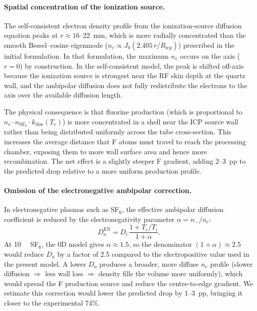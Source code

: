 \documentclass[11pt,a4paper]{report}
\newcommand{\SFsix}{\mathrm{SF}_6}
\newcommand{\Te}{T_e}
\begin{document}
\paragraph{Spatial concentration of the ionization source.}
The self-consistent electron density profile from the ionization-source diffusion equation peaks at $r \approx 16$--\SI{22}{\milli\meter}, which is more radially concentrated than the smooth Bessel--cosine eigenmode ($n_e \propto J_0(2.405\,r/R_\mathrm{icp})$) prescribed in the initial formulation.  In that formulation, the maximum $n_e$ occurs on the axis ($r = 0$) by construction.  In the self-consistent model, the peak is shifted off-axis because the ionization source is strongest near the RF skin depth at the quartz wall, and the ambipolar diffusion does not fully redistribute the electrons to the axis over the available diffusion length.

The physical consequence is that fluorine production (which is proportional to $n_e \cdot n_{\SFsix} \cdot k_\mathrm{diss}(\Te)$) is more concentrated in a shell near the ICP source wall rather than being distributed uniformly across the tube cross-section.  This increases the average distance that F atoms must travel to reach the processing chamber, exposing them to more wall surface area and hence more recombination.  The net effect is a slightly steeper F gradient, adding 2--3~pp to the predicted drop relative to a more uniform production profile.

\paragraph{Omission of the electronegative ambipolar correction.}
In electronegative plasmas such as SF$_6$, the effective ambipolar diffusion coefficient is reduced by the electronegativity parameter $\alpha = n_-/n_e$:
\begin{equation}
  D_a^\mathrm{EN} = D_i\,\frac{1 + \Te/T_i}{1 + \alpha}.
  \label{eq:Da-EN}
\end{equation}
At \SI{10}{\milli\torr} SF$_6$, the 0D model gives $\alpha \approx 1.5$, so the denominator $(1+\alpha) \approx 2.5$ would reduce $D_a$ by a factor of 2.5 compared to the electropositive value used in the present model.  A lower $D_a$ produces a broader, more diffuse $n_e$ profile (slower diffusion $\Rightarrow$ less wall loss $\Rightarrow$ density fills the volume more uniformly), which would spread the F production source and reduce the centre-to-edge gradient.  We estimate this correction would lower the predicted drop by 1--3~pp, bringing it closer to the experimental 74\%.
\end{document}
